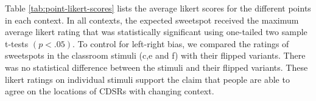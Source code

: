 \documentclass[11pt,letterpaper]{article}
\begin{document}


Table \ref{tab:point-likert-scores} lists the average likert scores for the different points in each context. In all contexts, the expected sweetspot received the maximum average likert rating that was statistically significant using one-tailed two sample t-tests $(p<.05)$.  To control for left-right bias, we compared the ratings of sweetspots in the classroom stimuli (c,e and f) with their flipped variants.  There was no statistical difference between the stimuli and their flipped variants.  These likert ratings on individual stimuli support the claim that people are able to agree on the locations of CDSRs with changing context.  


\end{document}
